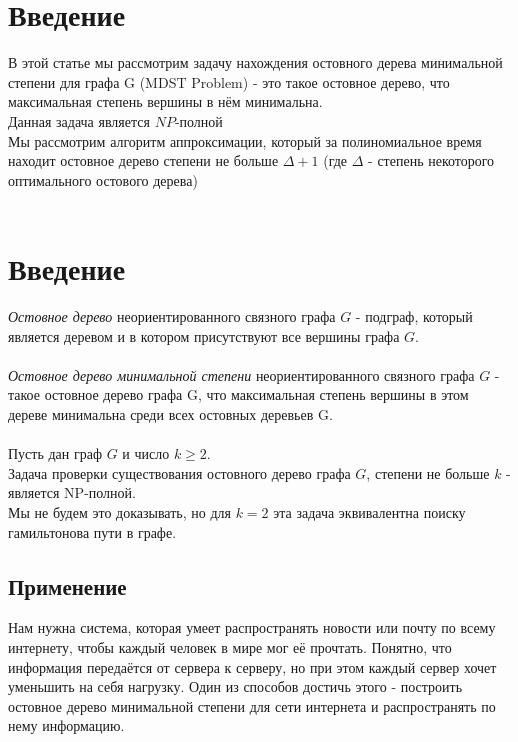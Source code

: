\documentclass[a4paper, 12pt]{article}
\begin{document}
\section*{Введение}
В этой статье мы рассмотрим задачу нахождения остовного дерева минимальной степени для графа G (MDST Problem) - это такое остовное дерево, что максимальная степень вершины в нём минимальна.\\
Данная задача является $NP$-полной\\
Мы рассмотрим алгоритм аппроксимации, который за полиномиальное время находит остовное дерево степени не больше $\Delta + 1$ (где $\Delta$ - степень некоторого оптимального остового дерева)\\\\

\section{Введение}
\textit{Остовное дерево} неориентированного связного графа $G$ - подграф, который является деревом и в котором присутствуют все вершины графа $G$.\\
\\
\textit{Остовное дерево минимальной степени} неориентированного связного графа $G$ - такое остовное дерево графа G, что максимальная степень вершины в этом дереве минимальна среди всех остовных деревьев G.\\
\\
Пусть дан граф $G$ и число $k \geqslant 2$.\\
Задача проверки существования остовного дерево графа $G$, степени не больше $k$ - является NP-полной.\\
Мы не будем это доказывать, но для $k=2$ эта задача эквивалентна поиску гамильтонова пути в графе.\\

\subsection{Применение}
Нам нужна система, которая умеет распространять новости или почту по всему интернету, чтобы каждый человек в мире мог её прочтать. Понятно, что информация передаётся от сервера к серверу, но при этом каждый сервер хочет уменьшить на себя нагрузку. Один из способов достичь этого - построить остовное дерево минимальной степени для сети интернета и распространять по нему информацию.\\\\
\end{document}
